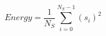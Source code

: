 \begin{displaymath}
\mathit{Energy} = \frac{1}{N_S} \sum_{i=0}^{N_S-1} (s_i)^2
\label{eq:energy}
\end{displaymath}
